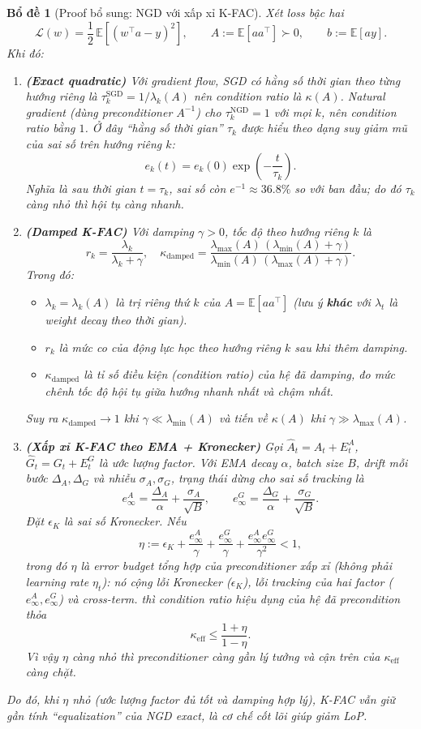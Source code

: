 \documentclass[11pt]{article}
\newcommand{\E}{\mathbb{E}}
\newtheorem{lemma}{Bổ đề}[section]
\begin{document}
\begin{lemma}[Proof bổ sung: NGD với xấp xỉ K-FAC]
Xét loss bậc hai
\[
\mathcal{L}(w)=\frac12\,\E[(w^\top a-y)^2],\qquad
A:=\E[aa^\top]\succ0,\qquad b:=\E[ay].
\]
Khi đó:
\begin{enumerate}
\item \textbf{(Exact quadratic)} Với gradient flow, SGD có hằng số thời gian theo từng hướng riêng là
$\tau_k^{\mathrm{SGD}}=1/\lambda_k(A)$ nên condition ratio là $\kappa(A)$.
Natural gradient (dùng preconditioner $A^{-1}$) cho
$\tau_k^{\mathrm{NGD}}=1$ với mọi $k$, nên condition ratio bằng $1$.
Ở đây ``hằng số thời gian'' $\tau_k$ được hiểu theo dạng suy giảm mũ của sai số trên hướng riêng $k$:
\[
e_k(t)=e_k(0)\exp\!\left(-\frac{t}{\tau_k}\right).
\]
Nghĩa là sau thời gian $t=\tau_k$, sai số còn $e^{-1}\approx 36.8\%$ so với ban đầu; do đó
$\tau_k$ càng nhỏ thì hội tụ càng nhanh.

\item \textbf{(Damped K-FAC)} Với damping $\gamma>0$, tốc độ theo hướng riêng $k$ là
\[
r_k=\frac{\lambda_k}{\lambda_k+\gamma},
\quad
\kappa_{\mathrm{damped}}
=
\frac{\lambda_{\max}(A)\,(\lambda_{\min}(A)+\gamma)}
{\lambda_{\min}(A)\,(\lambda_{\max}(A)+\gamma)}.
\]
Trong đó:
\begin{itemize}
\item $\lambda_k=\lambda_k(A)$ là trị riêng thứ $k$ của $A=\E[aa^\top]$ (lưu ý \textbf{khác} với $\lambda_t$ là weight decay theo thời gian).
\item $r_k$ là mức co của động lực học theo hướng riêng $k$ sau khi thêm damping.
\item $\kappa_{\mathrm{damped}}$ là tỉ số điều kiện (condition ratio) của hệ đã damping, đo mức chênh tốc độ hội tụ giữa hướng nhanh nhất và chậm nhất.
\end{itemize}
Suy ra $\kappa_{\mathrm{damped}}\to 1$ khi $\gamma\ll\lambda_{\min}(A)$ và tiến về $\kappa(A)$ khi $\gamma\gg\lambda_{\max}(A)$.

\item \textbf{(Xấp xỉ K-FAC theo EMA + Kronecker)} Gọi $\hat A_t=A_t+E_t^A$, $\hat G_t=G_t+E_t^G$ là ước lượng factor.
Với EMA decay $\alpha$, batch size $B$, drift mỗi bước $\Delta_A,\Delta_G$ và nhiễu $\sigma_A,\sigma_G$, trạng thái dừng cho sai số tracking là
\[
e_\infty^A=\frac{\Delta_A}{\alpha}+\frac{\sigma_A}{\sqrt B},
\qquad
e_\infty^G=\frac{\Delta_G}{\alpha}+\frac{\sigma_G}{\sqrt B}.
\]
Đặt $\epsilon_K$ là sai số Kronecker.
Nếu
\[
\eta
:=
\epsilon_K
+\frac{e_\infty^A}{\gamma}
+\frac{e_\infty^G}{\gamma}
+\frac{e_\infty^Ae_\infty^G}{\gamma^2}
<1,
\]
trong đó $\eta$ là \emph{error budget} tổng hợp của preconditioner xấp xỉ (không phải learning rate $\eta_t$):
nó cộng lỗi Kronecker ($\epsilon_K$), lỗi tracking của hai factor ($e_\infty^A,e_\infty^G$) và cross-term.
thì condition ratio hiệu dụng của hệ đã precondition thỏa
\[
\kappa_{\mathrm{eff}}\le \frac{1+\eta}{1-\eta}.
\]
Vì vậy $\eta$ càng nhỏ thì preconditioner càng gần lý tưởng và cận trên của $\kappa_{\mathrm{eff}}$ càng chặt.
\end{enumerate}
Do đó, khi $\eta$ nhỏ (ước lượng factor đủ tốt và damping hợp lý), K-FAC vẫn giữ gần tính ``equalization'' của NGD exact, là cơ chế cốt lõi giúp giảm LoP.
\end{lemma}
\end{document}
